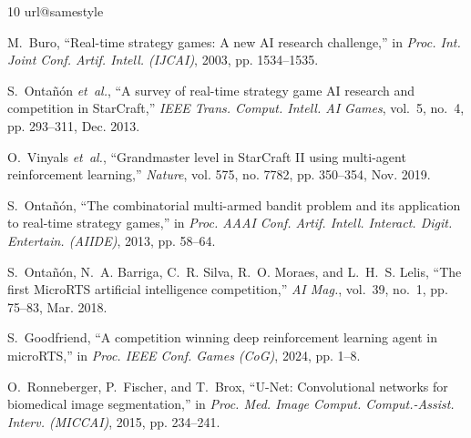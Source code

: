 \documentclass[conference]{IEEEtran}
\begin{document}
\hypersetup{urlcolor=black}
\begin{thebibliography}{10}
\providecommand{\url}[1]{#1}
\csname url@samestyle\endcsname
\providecommand{\newblock}{\relax}
\providecommand{\bibinfo}[2]{#2}
\providecommand{\BIBentrySTDinterwordspacing}{\spaceskip=0pt\relax}
\providecommand{\BIBentryALTinterwordstretchfactor}{4}
\providecommand{\BIBentryALTinterwordspacing}{\spaceskip=\fontdimen2\font plus
\BIBentryALTinterwordstretchfactor\fontdimen3\font minus
  \fontdimen4\font\relax}
\providecommand{\BIBforeignlanguage}[2]{{%
\expandafter\ifx\csname l@#1\endcsname\relax
\typeout{** WARNING: IEEEtran.bst: No hyphenation pattern has been}%
\typeout{** loaded for the language `#1'. Using the pattern for}%
\typeout{** the default language instead.}%
\else
\language=\csname l@#1\endcsname
\fi
#2}}
\providecommand{\BIBdecl}{\relax}
\BIBdecl
\renewcommand{\BIBentryALTinterwordstretchfactor}{4}

M.~Buro, ``Real-time strategy games: A new {AI} research challenge,'' in
  \emph{Proc. Int. Joint Conf. Artif. Intell. ({IJCAI})}, 2003, pp. 1534--1535.

S.~Onta{\~n}{\'o}n \emph{et~al.}, ``A survey of real-time strategy game {AI}
  research and competition in {StarCraft},'' \emph{{IEEE} Trans. Comput.
  Intell. {AI} Games}, vol.~5, no.~4, pp. 293--311, Dec. 2013.

O.~Vinyals \emph{et~al.}, ``Grandmaster level in {StarCraft II} using
  multi-agent reinforcement learning,'' \emph{Nature}, vol. 575, no. 7782, pp.
  350--354, Nov. 2019.

S.~Onta{\~n}{\'o}n, ``The combinatorial multi-armed bandit problem and its
  application to real-time strategy games,'' in \emph{Proc. {AAAI} Conf. Artif.
  Intell. Interact. Digit. Entertain. ({AIIDE})}, 2013, pp. 58--64.

S.~Onta{\~n}{\'o}n, N.~A. Barriga, C.~R. Silva, R.~O. Moraes, and L.~H.~S.
  Lelis, ``The first {MicroRTS} artificial intelligence competition,''
  \emph{{AI} Mag.}, vol.~39, no.~1, pp. 75--83, Mar. 2018.

S.~Goodfriend, ``A competition winning deep reinforcement learning agent in
  {microRTS},'' in \emph{Proc. {IEEE} Conf. Games ({CoG})}, 2024, pp. 1--8.

O.~Ronneberger, P.~Fischer, and T.~Brox, ``{U-Net}: Convolutional networks for
  biomedical image segmentation,'' in \emph{Proc. Med. Image Comput.
  Comput.-Assist. Interv. ({MICCAI})}, 2015, pp. 234--241.


\end{thebibliography}
\end{document}
